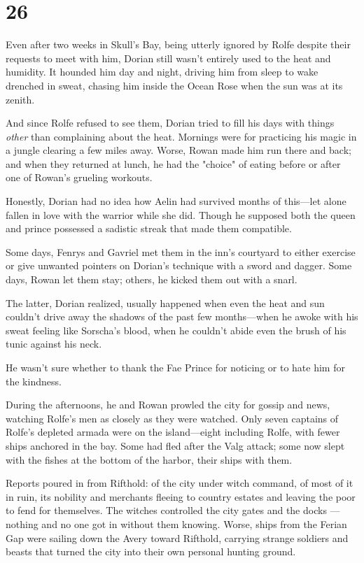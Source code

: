 
\chapter{26}

Even after two weeks in Skull's Bay, being utterly ignored by Rolfe despite their requests to meet with him, Dorian still wasn't entirely used to the heat and humidity.
It hounded him day and night, driving him from sleep to wake drenched in sweat, chasing him inside the Ocean Rose when the sun was at its zenith.

And since Rolfe refused to see them, Dorian tried to fill his days with things \emph{other} than complaining about the heat.
Mornings were for practicing his magic in a jungle clearing a few miles away.
Worse, Rowan made him run there and back; and when they returned at lunch, he had the "choice" of eating before or after one of Rowan's grueling workouts.

Honestly, Dorian had no idea how Aelin had survived months of this---let alone fallen in love with the warrior while she did.
Though he supposed both the queen and prince possessed a sadistic streak that made them compatible.

Some days, Fenrys and Gavriel met them in the inn's courtyard to either exercise or give unwanted pointers on Dorian's technique with a sword and dagger.
Some days, Rowan let them stay; others, he kicked them out with a snarl.

The latter, Dorian realized, usually happened when even the heat and sun couldn't drive away the shadows of the past few months---when he awoke with his sweat feeling like Sorscha's blood, when he couldn't abide even the brush of his tunic against his neck.

He wasn't sure whether to thank the Fae Prince for noticing or to hate him for the kindness.

During the afternoons, he and Rowan prowled the city for gossip and news, watching Rolfe's men as closely as they were watched.
Only seven captains of Rolfe's depleted armada were on the island---eight including Rolfe, with fewer ships anchored in the bay.
Some had fled after the Valg attack; some now slept with the fishes at the bottom of the harbor, their ships with them.

Reports poured in from Rifthold: of the city under witch command, of most of it in ruin, its nobility and merchants fleeing to country estates and leaving the poor to fend for themselves.
The witches controlled the city gates and the docks ---nothing and no one got in without them knowing.
Worse, ships from the Ferian Gap were sailing down the Avery toward Rifthold, carrying strange soldiers and beasts that turned the city into their own personal hunting ground.

